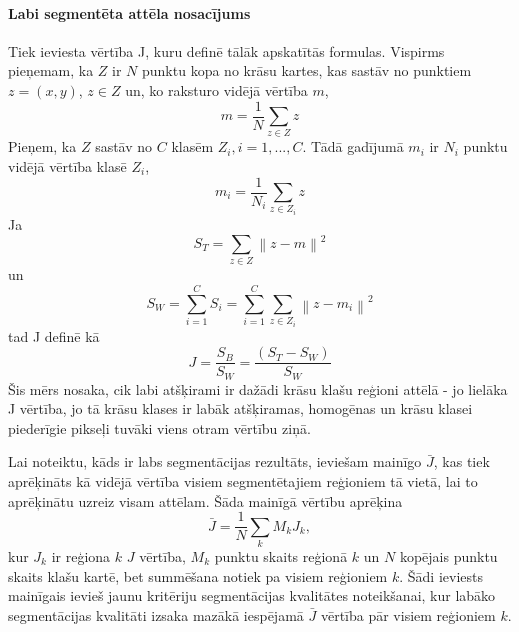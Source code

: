 \documentclass[12pt,paper=a4]{report}
\begin{document}
\paragraph{Labi segmentēta attēla nosacījums}Tiek ieviesta vērtība J, kuru definē tālāk apskatītās formulas. Vispirms pieņemam, ka $Z$ ir $N$ punktu kopa no krāsu kartes, kas sastāv no punktiem $z=(x,y)$, \(z \in Z\) un, ko raksturo vidējā vērtība $m$, 
\begin{equation}
m=\frac{1}{N}\sum_{z \in Z}z
\end{equation}
Pieņem, ka $Z$ sastāv no $C$ klasēm $Z_i, i=1,...,C$. Tādā gadījumā $m_i$ ir $N_i$ punktu vidējā vērtība klasē $Z_i$, 
\begin{equation}
m_i=\frac{1}{N_i}\sum_{z \in Z_i}z
\end{equation}
Ja
\begin{equation}
S_T=\sum_{z \in Z}\left \| z-m \right \|^2
\end{equation}
un
\begin{equation}
S_W=\sum_{i=1}^{C}S_i=\sum_{i=1}^{C} \sum_{z \in Z_i} \left \| z-m_i \right \|^2
\end{equation}
tad J definē kā
\begin{equation}
J=\frac{S_B}{S_W}=\frac{(S_T-S_W)}{S_W}
\end{equation}
Šis mērs nosaka, cik labi atšķirami ir dažādi krāsu klašu reģioni attēlā - jo lielāka J vērtība, jo tā krāsu klases ir labāk atšķiramas, homogēnas un krāsu klasei piederīgie pikseļi tuvāki viens otram vērtību ziņā.\cite{1colImSegm1999}\par
Lai noteiktu, kāds ir labs segmentācijas rezultāts, ieviešam mainīgo $\bar{J}$, kas tiek aprēķināts kā vidējā vērtība visiem segmentētajiem reģioniem tā vietā, lai to aprēķinātu uzreiz visam attēlam. Šāda mainīgā vērtību aprēķina
\begin{equation}
\bar{J}=\frac{1}{N}\sum_k M_k J_k,
\end{equation}
kur $J_k$ ir reģiona $k$ $J$ vērtība, $M_k$ punktu skaits reģionā $k$ un $N$ kopējais punktu skaits klašu kartē, bet summēšana notiek pa visiem reģioniem $k$. Šādi ieviests mainīgais ievieš jaunu kritēriju segmentācijas kvalitātes noteikšanai, kur labāko segmentācijas kvalitāti izsaka mazākā iespējamā $\bar{J}$ vērtība pār visiem reģioniem $k$. \cite{1colImSegm1999}\par
\end{document}
